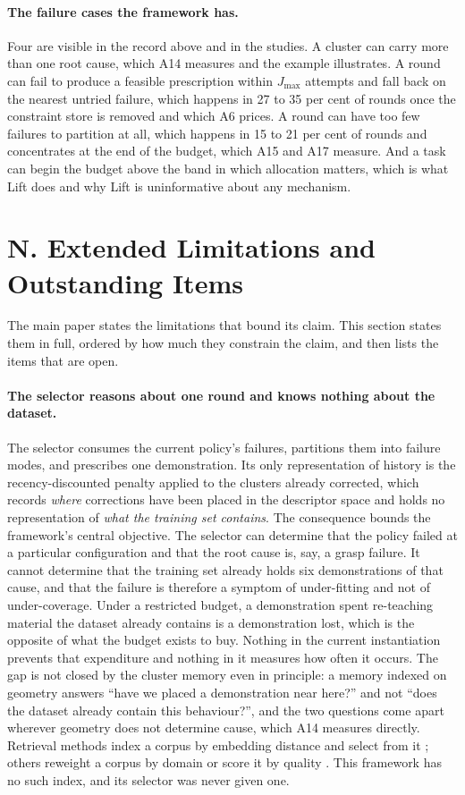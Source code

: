 \documentclass[letterpaper]{article}
\begin{document}
\paragraph{The failure cases the framework has.} Four are visible in the record above and
in the studies. A cluster can carry more than one root cause, which A14 measures and the
example illustrates. A round can fail to produce a feasible prescription within
$J_{\max}$ attempts and fall back on the nearest untried failure, which happens in 27 to
35 per cent of rounds once the constraint store is removed and which A6 prices. A round
can have too few failures to partition at all, which happens in 15 to 21 per cent of
rounds and concentrates at the end of the budget, which A15 and A17 measure. And a task
can begin the budget above the band in which allocation matters, which is what Lift does
and why Lift is uninformative about any mechanism.

\section{N. Extended Limitations and Outstanding Items}

The main paper states the limitations that bound its claim. This section states them in
full, ordered by how much they constrain the claim, and then lists the items that are
open.

\paragraph{The selector reasons about one round and knows nothing about the dataset.}
The selector consumes the current policy's failures, partitions them into failure modes,
and prescribes one demonstration. Its only representation of history is the
recency-discounted penalty applied to the clusters already corrected, which records
\emph{where} corrections have been placed in the descriptor space and holds no
representation of \emph{what the training set contains}. The consequence bounds the
framework's central objective. The selector can determine that the policy failed at a
particular configuration and that the root cause is, say, a grasp failure. It cannot
determine that the training set already holds six demonstrations of that cause, and that
the failure is therefore a symptom of under-fitting and not of under-coverage. Under a
restricted budget, a demonstration spent re-teaching material the dataset already
contains is a demonstration lost, which is the opposite of what the budget exists to buy.
Nothing in the current instantiation prevents that expenditure and nothing in it measures
how often it occurs. The gap is not closed by the cluster memory even in principle: a
memory indexed on geometry answers ``have we placed a demonstration near here?'' and not
``does the dataset already contain this behaviour?'', and the two questions come apart
wherever geometry does not determine cause, which A14 measures directly. Retrieval methods index a corpus
by embedding distance and select from it \citep{memmel2025strap}; others reweight a
corpus by domain \citep{hejna2024remix} or score it by quality
\citep{belkhale2023dataquality}. This framework has no such index, and its selector was
never given one.
\end{document}
